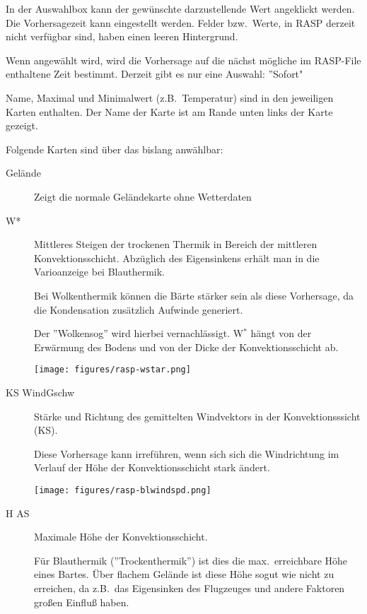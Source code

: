 In der Auswahlbox kann der gewünschte darzustellende Wert angeklickt werden.
Die Vorhersagezeit kann eingestellt werden. Felder bzw.\ Werte, in RASP derzeit nicht verfügbar sind,
haben einen leeren Hintergrund.

 Wenn   angewählt wird, wird die Vorhersage auf die nächst mögliche im RASP-File
enthaltene Zeit bestimmt.  Derzeit gibt es nur eine Auswahl: ''Sofort"

Name, Maximal und Minimalwert (z.B.\ Temperatur) sind in den jeweiligen Karten enthalten.
Der Name der Karte ist am Rande unten links der Karte gezeigt.

Folgende Karten sind über das   bislang anwählbar:
\begin{description}
\item[Gelände] Zeigt die normale Geländekarte ohne Wetterdaten
\item[W*]
Mittleres Steigen  der trockenen Thermik in Bereich der mittleren Konvektionsschicht.
Abzüglich des Eigensinkens erhält man in die Varioanzeige  bei Blauthermik.

Bei Wolkenthermik können die Bärte stärker sein als diese Vorhersage,  da die
Kondensation zusätzlich Aufwinde generiert.

Der ''Wolkensog''  wird hierbei vernachlässigt.
W$^\ast$ hängt von der Erwärmung des Bodens  und von der Dicke der Konvektionsschicht ab.

\begin{center}
\texttt{[image: figures/rasp-wstar.png]}
\end{center}

\item[KS WindGschw]
Stärke und Richtung des gemittelten Windvektors  in der Konvektionsssicht (KS).

Diese Vorhersage kann irreführen, wenn sich sich die Windrichtung im Verlauf der
Höhe der Konvektionsschicht stark ändert.

\begin{center}
\texttt{[image: figures/rasp-blwindspd.png]}
\end{center}

\item[H AS]
Maximale Höhe der Konvektionsschicht.

Für Blauthermik (''Trockenthermik'') ist dies die max.\ erreichbare Höhe eines Bartes.
Über flachem Gelände ist diese Höhe sogut wie nicht zu erreichen, da z.B.\ das
Eigensinken des Flugzeuges und andere Faktoren großen Einfluß haben.


\end{description}
